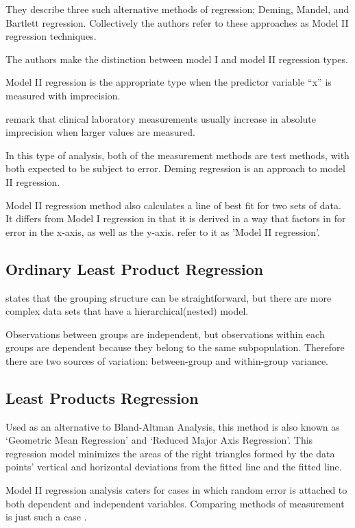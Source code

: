 \documentclass[12pt, a4paper]{report}
\theoremstyle{plain}
\theoremstyle{definition}
\theoremstyle{remark}
\begin{document}
They describe three such alternative methods of regression; Deming, Mandel, and Bartlett regression. Collectively the authors refer to these approaches as Model II regression techniques.

The authors make the distinction between model I and model II regression types.

Model II regression is the appropriate type when the predictor variable “x” is measured with imprecision.

\citet{CornCoch} remark that clinical laboratory measurements usually increase in absolute imprecision when larger values are measured.


In this type of analysis, both of the measurement methods are test methods, with both expected to be subject to error. Deming regression is an approach to model II regression.

Model II regression method also calculates a line of best fit for two sets of data. It differs from Model I regression in that it is derived in a way that factors in for error in the x-axis, as well as the y-axis. \citet{CornCoch} refer to it as 'Model II regression'.		
		
		
\subsection{Ordinary Least Product Regression}
		\citet{ludbrook97} states that the grouping structure can be
		straightforward, but there are more complex data sets that have a hierarchical(nested) model.
		
Observations between groups are independent, but observations
		within each groups are dependent because they belong to the same
		subpopulation. Therefore there are two sources of variation:
		between-group and within-group variance.
\subsection{Least Products Regression}
Used as an alternative to Bland-Altman Analysis, this method is also known as `Geometric Mean Regression' and `Reduced Major Axis Regression'. This regression model minimizes the areas of the right triangles formed by the data points' vertical and horizontal deviations from the fitted line and the fitted line.
		
Model II regression analysis caters for cases in which random error is attached to both dependent and independent variables. Comparing methods of measurement is just such a case \citep{ludbrook97, ludbrook02}.
		
\end{document}
